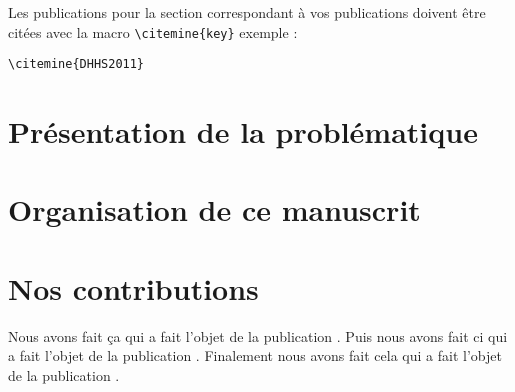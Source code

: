 Les publications pour la section correspondant à vos publications doivent être citées avec la macro \texttt{\textbackslash citemine\{key\}} exemple : \\

\noindent{} 
\begin{verbatim}\citemine{DHHS2011}\end{verbatim}


\section{Présentation de la problématique}

\section{Organisation de ce manuscrit}

\section{Nos contributions}

Nous avons fait ça qui a fait l'objet de la publication . Puis nous avons fait ci qui a fait l'objet de la publication . Finalement nous avons fait cela qui a fait l'objet de la publication .
 

  
\renewcommand{\bibtitle}{\section*{\refname}}


